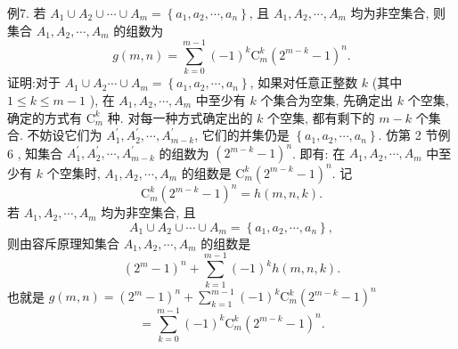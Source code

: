 例7. 若 $A_1 \cup A_2 \cup \cdots \cup A_m=\left\{a_1, a_2, \cdots, a_n\right\}$, 且 $A_1, A_2, \cdots, A_m$ 均为非空集合, 则集合 $A_1, A_2, \cdots, A_m$ 的组数为
$$
g(m, n)=\sum_{k=0}^{m-1}(-1)^k \mathrm{C}_m^k\left(2^{m-k}-1\right)^n .
$$
证明:对于 $A_1 \cup A_2 \cdots \cup A_m=\left\{a_1, a_2, \cdots, a_n\right\}$, 如果对任意正整数 $k$ (其中 $1 \leqslant k \leqslant m-1$ ), 在 $A_1, A_2, \cdots, A_m$ 中至少有 $k$ 个集合为空集, 先确定出 $k$ 个空集, 确定的方式有 $\mathrm{C}_m^k$ 种.
对每一种方式确定出的 $k$ 个空集, 都有剩下的 $m-k$ 个集合.
不妨设它们为 $A_1^{\prime}, A_2^{\prime}, \cdots, A_{m-k}^{\prime}$, 它们的并集仍是 $\left\{a_1, a_2, \cdots, a_n\right\}$.
仿第 2 节例 6 , 知集合 $A_1^{\prime}, A_2^{\prime}, \cdots, A_{m-k}^{\prime}$ 的组数为 $\left(2^{m-k}-1\right)^n$.
即有: 在 $A_1, A_2, \cdots, A_m$ 中至少有 $k$ 个空集时, $A_1, A_2, \cdots, A_m$ 的组数是 $\mathrm{C}_m^k\left(2^{m-k}-1\right)^n$. 记
$$
\mathrm{C}_m^k\left(2^{m-k}-1\right)^n=h(m, n, k) .
$$
若 $A_1, A_2, \cdots, A_m$ 均为非空集合, 且
$$
A_1 \cup A_2 \cup \cdots \cup A_m=\left\{a_1, a_2, \cdots, a_n\right\},
$$
则由容斥原理知集合 $A_1, A_2, \cdots, A_m$ 的组数是
$$
\left(2^m-1\right)^n+\sum_{k=1}^{m-1}(-1)^k h(m, n, k) .
$$
也就是 $g(m, n)=\left(2^m-1\right)^n+\sum_{k=1}^{m-1}(-1)^k \mathrm{C}_m^k\left(2^{m-k}-1\right)^n$
$$
=\sum_{k=0}^{m-1}(-1)^k \mathrm{C}_m^k\left(2^{m-k}-1\right)^n .
$$



